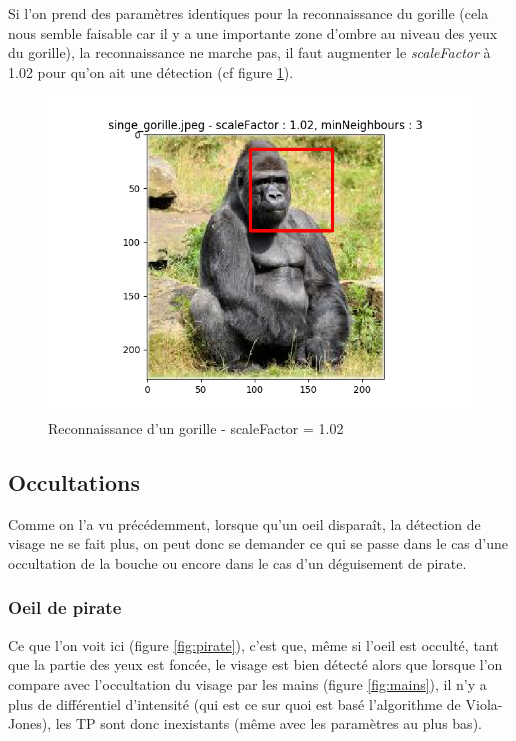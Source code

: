 \documentclass[a4paper,11pt]{article}
\begin{document}
	Si l'on prend des paramètres identiques pour la reconnaissance du gorille (cela nous semble
	faisable car il y a une importante zone d'ombre au niveau des yeux du gorille), la
	reconnaissance ne marche pas, il faut augmenter le \textit{scaleFactor} à 1.02 pour qu'on
	ait une détection (cf figure \ref{fig:singe2}).

	\begin{figure}[H]
	    \begin{center}
		\includegraphics[scale = 0.6]{images/singe_gorille_1,02_3.png}
		\caption{Reconnaissance d'un gorille - scaleFactor = 1.02}
		\label{fig:singe2}
	    \end{center}
	\end{figure}

    \subsection{Occultations}
	
	Comme on l'a vu précédemment, lorsque qu'un oeil disparaît, la détection de visage ne se
	fait plus, on peut donc se demander ce qui se passe dans le cas d'une occultation de la
	bouche ou encore dans le cas d'un déguisement de pirate.

	\subsubsection{Oeil de pirate}

	    Ce que l'on voit ici (figure \ref{fig:pirate}), c'est que, même si l'oeil est occulté, tant
	    que la partie des yeux est foncée, le visage est bien détecté alors que lorsque l'on
	    compare avec l'occultation du visage par les mains (figure \ref{fig:mains}), il n'y a
	    plus de différentiel d'intensité (qui est ce sur quoi est basé l'algorithme de
	    Viola-Jones), les TP sont donc inexistants (même avec les paramètres au plus bas).
\end{document}

